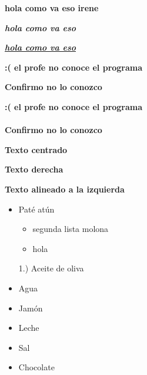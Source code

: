 \textbf{hola como va eso irene}

\textit{\textbf{hola como va eso}}

\underline{\textit{\textbf{hola como va eso}}}

\newpage

\textbf{:( el profe no conoce el programa} 

\textbf{\textbf{Confirmo no lo conozco}}

\textbf{:( el profe no conoce el programa} \\ \\

\textbf{\textbf{Confirmo no lo conozco}}

\begin{center}
    \textbf{Texto centrado}
\end{center}

\begin{flushright}
    \textbf{Texto derecha}
\end{flushright}

\begin{flushleft}
    \textbf{Texto alineado a la izquierda}
\end{flushleft}

\begin{itemize}
    \item Paté atún
    \begin{itemize}
        \item segunda lista molona
        \item hola
    \end{itemize}
    \item[1.)] Aceite de oliva
    \item Agua
    \item Jamón 
    \item Leche
    \item Sal
    \item Chocolate
\end{itemize}

